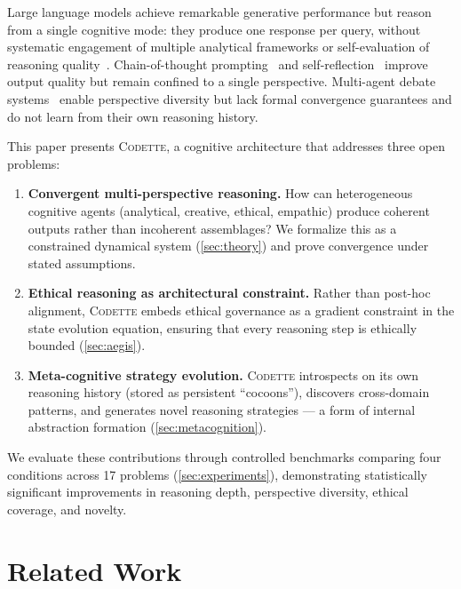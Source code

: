 \documentclass[11pt,a4paper]{article}
\newcommand{\codette}{\textsc{Codette}}
\begin{document}
Large language models achieve remarkable generative performance but reason from a single cognitive mode: they produce one response per query, without systematic engagement of multiple analytical frameworks or self-evaluation of reasoning quality~\citep{bender2021dangers,bommasani2021opportunities}. Chain-of-thought prompting~\citep{wei2022chain} and self-reflection~\citep{shinn2023reflexion} improve output quality but remain confined to a single perspective. Multi-agent debate systems~\citep{wu2023autogen} enable perspective diversity but lack formal convergence guarantees and do not learn from their own reasoning history.

This paper presents \codette{}, a cognitive architecture that addresses three open problems:

\begin{enumerate}[leftmargin=*]
  \item \textbf{Convergent multi-perspective reasoning.} How can heterogeneous cognitive agents (analytical, creative, ethical, empathic) produce coherent outputs rather than incoherent assemblages? We formalize this as a constrained dynamical system (\cref{sec:theory}) and prove convergence under stated assumptions.

  \item \textbf{Ethical reasoning as architectural constraint.} Rather than post-hoc alignment, \codette{} embeds ethical governance as a gradient constraint in the state evolution equation, ensuring that every reasoning step is ethically bounded (\cref{sec:aegis}).

  \item \textbf{Meta-cognitive strategy evolution.} \codette{} introspects on its own reasoning history (stored as persistent ``cocoons''), discovers cross-domain patterns, and generates novel reasoning strategies --- a form of internal abstraction formation (\cref{sec:metacognition}).
\end{enumerate}

We evaluate these contributions through controlled benchmarks comparing four conditions across 17 problems (\cref{sec:experiments}), demonstrating statistically significant improvements in reasoning depth, perspective diversity, ethical coverage, and novelty.

\section{Related Work}
\label{sec:related}
\end{document}
